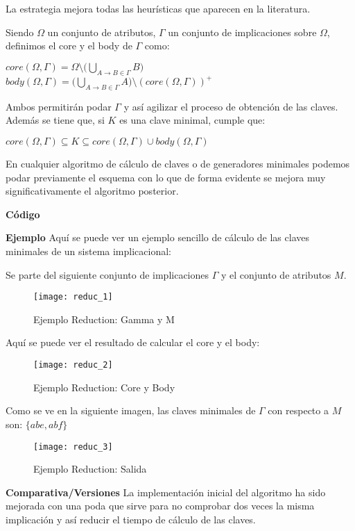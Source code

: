 La estrategia mejora todas las heur\'isticas que aparecen en la literatura. 

Siendo \(\Omega\) un conjunto de atributos, \(\Gamma\) un conjunto de implicaciones sobre \(\Omega\), definimos el core y el body de \(\Gamma\) como:
\begin{center}
    \(core(\Omega,\Gamma) = \Omega \setminus \Big(\bigcup_{A \to B \in \Gamma} B\Big) \ \ \ \ \)
    \(body(\Omega,\Gamma) = \Big(\bigcup_{A \to B \in \Gamma} A\Big) \setminus (core(\Omega,\Gamma))^+\)
\end{center}
Ambos permitir\'an podar \(\Gamma\) y as\'i agilizar el proceso de obtenci\'on de las claves. Adem\'as se tiene que, si \(K\) es una clave minimal, cumple que: 
\begin{center}
    \(core(\Omega,\Gamma) \subseteq K \subseteq core(\Omega,\Gamma) \cup body(\Omega,\Gamma)\)
\end{center}

En cualquier algoritmo de c\'alculo de claves o de generadores minimales podemos podar previamente el esquema con lo que de forma evidente se mejora muy significativamente el algoritmo posterior.

\newpage
\textbf{C\'odigo} 

\newpage


\newpage
\textbf{Ejemplo} 
Aqu\'i se puede ver un ejemplo sencillo de c\'alculo de las claves minimales de un sistema implicacional:

Se parte del siguiente conjunto de implicaciones \(\Gamma\) y el conjunto de atributos \(M\).
\begin{figure}[H]
    \centering
    \texttt{[image: reduc\_1]}
    \caption{Ejemplo Reduction: Gamma y M}
    \label{fig:reduc_1}
\end{figure}
Aqu\'i se puede ver el resultado de calcular el core y el body:
\begin{figure}[H]
    \centering
    \texttt{[image: reduc\_2]}
    \caption{Ejemplo Reduction: Core y Body}
    \label{fig:reduc_2}
\end{figure}
Como se ve en la siguiente imagen, las claves minimales de \(\Gamma\) con respecto a \(M\) son: \(\{abe,abf\}\)
\begin{figure}[H]
    \centering
    \texttt{[image: reduc\_3]}
    \caption{Ejemplo Reduction: Salida}
    \label{fig:reduc_3}
\end{figure}

\textbf{Comparativa/Versiones} 
La implementaci\'on inicial del algoritmo ha sido mejorada con una poda que sirve para no comprobar dos veces la misma implicaci\'on y as\'i reducir el tiempo de c\'alculo de las claves.

